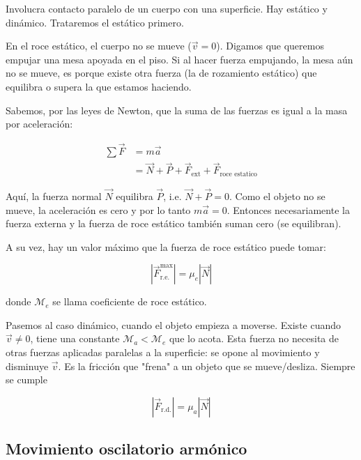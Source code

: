 \documentclass[12pt]{article}
\theoremstyle{definition}
\begin{document}
Involucra contacto paralelo de un cuerpo con una superficie. Hay estático y
dinámico. Trataremos el estático primero. 

En el roce estático, el cuerpo no se mueve ($\vec{v} = 0$). Digamos que queremos
empujar una mesa apoyada en el piso. Si al hacer fuerza empujando, la mesa aún
no se mueve, es porque existe otra fuerza (la de rozamiento estático) que
equilibra o supera la que estamos haciendo. 

Sabemos, por las leyes de Newton, que la suma de las fuerzas es igual a la masa
por aceleración: 

\begin{align*}
    \sum \vec{F} &= m \vec{a}  \\ 
                 &= \vec{N} + \vec{P} + \vec{F}_{\text{ext}} +
                 \vec{F}_{\text{roce estatico}}
\end{align*}

Aquí, la fuerza normal $\vec{N}$ equilibra $\vec{P}$, i.e. $\vec{N} + \vec{P} =
0$. Como el objeto no se mueve, la aceleración es cero y por lo tanto $m\vec{a}
= 0$. Entonces necesariamente la fuerza externa y la fuerza de roce estático
también suman cero (se equilibran). 

A su vez, hay un valor máximo que la fuerza de roce estático puede tomar: 

\begin{equation*}
    \left| \vec{F}_{\text{r.e.}}^{\text{max}} \right| = \mu_e \left|
    \vec{N} \right| 
\end{equation*}

donde $\mathcal{M}_e$ se llama coeficiente de roce estático.

Pasemos al caso dinámico, cuando el objeto empieza a moverse. Existe cuando
$\vec{v} \neq 0$,  tiene una constante $\mathcal{M}_a < \mathcal{M}_e$ que lo
acota.  Esta fuerza no necesita de otras fuerzas aplicadas paralelas a la
superficie: se opone al movimiento y disminuye $\vec{v}$. Es la fricción que
"frena" a un objeto que se mueve/desliza. Siempre se cumple 

\begin{equation*}
    \left| \vec{F}_{\text{r.d.}} \right| = \mu_a \left| \vec{N} \right| 
\end{equation*} 

\subsection{Movimiento oscilatorio armónico}
\end{document}
